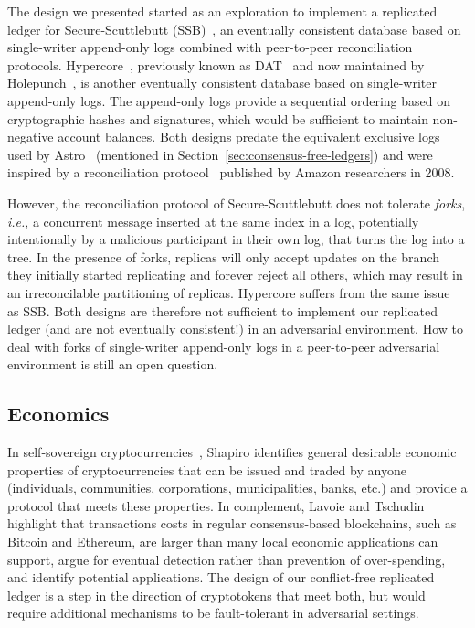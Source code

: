 \documentclass[9pt, oneside]{article}   	%
\begin{document}
The design we presented started as an exploration to implement a replicated ledger for Secure-Scuttlebutt (SSB)~\cite{kermarrec2020gossiping,tarr2019ssb}, an eventually consistent database based on single-writer append-only logs combined with peer-to-peer reconciliation protocols. Hypercore~\cite{hypercore-website}, previously known as DAT~\cite{ogden2017dat,robinson2018dat} and now maintained by Holepunch~\cite{holepunch-website}, is another eventually consistent database based on single-writer append-only logs. The append-only logs provide a sequential ordering based on cryptographic hashes and signatures, which would be sufficient to maintain non-negative account balances.  Both designs predate the equivalent exclusive logs used by Astro~\cite{collins2020broadcast-payment} (mentioned in Section~\ref{sec:consensus-free-ledgers}) and were inspired by a reconciliation protocol~\cite{vanRenesse2008reconciliation} published by Amazon researchers in 2008. 

However, the reconciliation protocol of Secure-Scuttlebutt does not tolerate \textit{forks}, \textit{i.e.}, a concurrent message inserted at the same index in a log, potentially intentionally by a malicious participant in their own log, that turns the log into a tree. In the presence of forks, replicas will only accept updates on the branch they initially started replicating and forever reject all others, which may result in an irreconcilable partitioning of replicas.  Hypercore suffers from the same issue~\cite{hypercore-handling-conflicts,hypercore-split-resolution-dep}  as SSB. Both designs are therefore not sufficient to implement our replicated ledger (and are not eventually consistent!) in an adversarial environment. How to deal with forks of single-writer append-only logs in a peer-to-peer adversarial environment is still an open question.

\subsection{Economics}
\label{sec:economics}

In self-sovereign cryptocurrencies~\cite{shapiro2023sovereign}, Shapiro identifies general desirable economic properties of cryptocurrencies that can be issued and traded by anyone (individuals, communities, corporations, municipalities, banks, etc.) and provide a protocol that meets these properties. In complement, Lavoie and Tschudin~\cite{lavoie2022localcryptotokens} highlight that transactions costs in regular consensus-based blockchains, such as Bitcoin and Ethereum, are larger than many local economic applications can support, argue for eventual detection rather than prevention of over-spending, and identify potential applications. The design of our conflict-free replicated ledger is a step in the direction of cryptotokens that meet both, but would require additional mechanisms to be fault-tolerant in adversarial settings.
\end{document}
